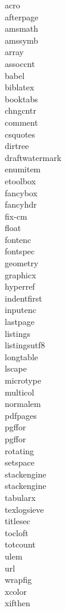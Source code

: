 \begin{appendices}
\begin{multicols}{3}
    \noindent
    acro\\
    afterpage\\
    amsmath\\
    amssymb\\
    array\\
    assoccnt\\
    babel\\
    biblatex\\
    booktabs\\
    chngcntr\\
    comment\\
    csquotes\\
    dirtree\\
    draftwatermark\\
    enumitem\\
    etoolbox\\
    fancybox\\
    fancyhdr\\
    fix-cm\\
    float\\
    fontenc\\
    fontspec\\
    geometry\\
    graphicx\\
    hyperref\\
    indentfirst\\
    inputenc\\
    lastpage\\
    listings\\
    listingsutf8\\
    longtable\\
    lscape\\
    microtype\\
    multicol\\
    normalem\\
    pdfpages\\
    pgffor\\
    pgffor\\
    rotating\\
    setspace\\
    stackengine\\
    stackengine\\
    tabularx\\
    texlogsieve\\
    titlesec\\
    tocloft\\
    totcount\\
    ulem\\
    url\\
    wrapfig\\
    xcolor\\
    xifthen

\end{multicols}
\end{appendices}